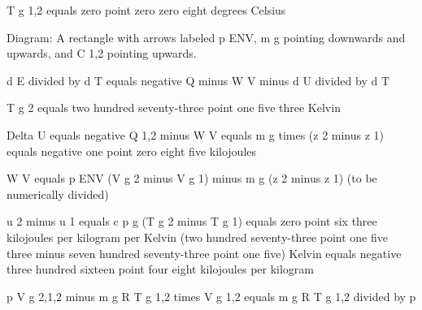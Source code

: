 T g 1,2 equals zero point zero zero eight degrees Celsius

Diagram: A rectangle with arrows labeled p ENV, m g pointing downwards and upwards, and C 1,2 pointing upwards.

d E divided by d T equals negative Q minus W V minus d U divided by d T

T g 2 equals two hundred seventy-three point one five three Kelvin

Delta U equals negative Q 1,2 minus W V equals m g times (z 2 minus z 1) equals negative one point zero eight five kilojoules

W V equals p ENV (V g 2 minus V g 1) minus m g (z 2 minus z 1) (to be numerically divided)

u 2 minus u 1 equals c p g (T g 2 minus T g 1) equals zero point six three kilojoules per kilogram per Kelvin (two hundred seventy-three point one five three minus seven hundred seventy-three point one five) Kelvin equals negative three hundred sixteen point four eight kilojoules per kilogram

p V g 2,1,2 minus m g R T g 1,2 times V g 1,2 equals m g R T g 1,2 divided by p